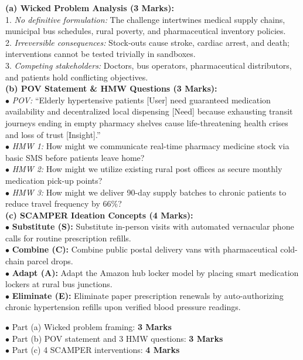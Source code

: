 \begin{solutionbox}
\textbf{(a) Wicked Problem Analysis (3 Marks):}\\
1. \textit{No definitive formulation:} The challenge intertwines medical supply chains, municipal bus schedules, rural poverty, and pharmaceutical inventory policies.\\
2. \textit{Irreversible consequences:} Stock-outs cause stroke, cardiac arrest, and death; interventions cannot be tested trivially in sandboxes.\\
3. \textit{Competing stakeholders:} Doctors, bus operators, pharmaceutical distributors, and patients hold conflicting objectives.\\
\textbf{(b) POV Statement \& HMW Questions (3 Marks):}\\
$\bullet$ \textit{POV:} ``Elderly hypertensive patients [User] need guaranteed medication availability and decentralized local dispensing [Need] because exhausting transit journeys ending in empty pharmacy shelves cause life-threatening health crises and loss of trust [Insight].''\\
$\bullet$ \textit{HMW 1:} How might we communicate real-time pharmacy medicine stock via basic SMS before patients leave home?\\
$\bullet$ \textit{HMW 2:} How might we utilize existing rural post offices as secure monthly medication pick-up points?\\
$\bullet$ \textit{HMW 3:} How might we deliver 90-day supply batches to chronic patients to reduce travel frequency by 66\%?\\
\textbf{(c) SCAMPER Ideation Concepts (4 Marks):}\\
$\bullet$ \textbf{Substitute (S):} Substitute in-person visits with automated vernacular phone calls for routine prescription refills.\\
$\bullet$ \textbf{Combine (C):} Combine public postal delivery vans with pharmaceutical cold-chain parcel drops.\\
$\bullet$ \textbf{Adapt (A):} Adapt the Amazon hub locker model by placing smart medication lockers at rural bus junctions.\\
$\bullet$ \textbf{Eliminate (E):} Eliminate paper prescription renewals by auto-authorizing chronic hypertension refills upon verified blood pressure readings.
\begin{markingrubric}
$\bullet$ Part (a) Wicked problem framing: \textbf{3 Marks}\\
$\bullet$ Part (b) POV statement and 3 HMW questions: \textbf{3 Marks}\\
$\bullet$ Part (c) 4 SCAMPER interventions: \textbf{4 Marks}
\end{markingrubric}
\end{solutionbox}

